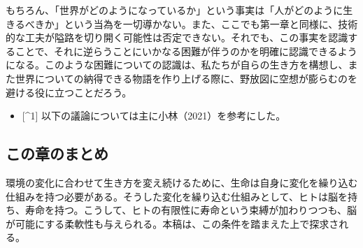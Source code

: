 もちろん、「世界がどのようになっているか」という事実は「人がどのように生きるべきか」という当為を一切導かない。また、ここでも第一章と同様に、技術的な工夫が隘路を切り開く可能性は否定できない。それでも、この事実を認識することで、それに逆らうことにいかなる困難が伴うのかを明確に認識できるようになる。このような困難についての認識は、私たちが自らの生き方を構想し、また世界についての納得できる物語を作り上げる際に、野放図に空想が膨らむのを避ける役に立つことだろう。

\begin{itemize}
\tightlist
\item
  {[}\^{}1{]} 以下の議論については主に小林（2021）を参考にした。
\end{itemize}

\subsection{この章のまとめ}\label{ux3053ux306eux7ae0ux306eux307eux3068ux3081}

環境の変化に合わせて生き方を変え続けるために、生命は自身に変化を繰り込む仕組みを持つ必要がある。そうした変化を繰り込む仕組みとして、ヒトは脳を持ち、寿命を持つ。こうして、ヒトの有限性に寿命という束縛が加わりつつも、脳が可能にする柔軟性も与えられる。本稿は、この条件を踏まえた上で探求される。

